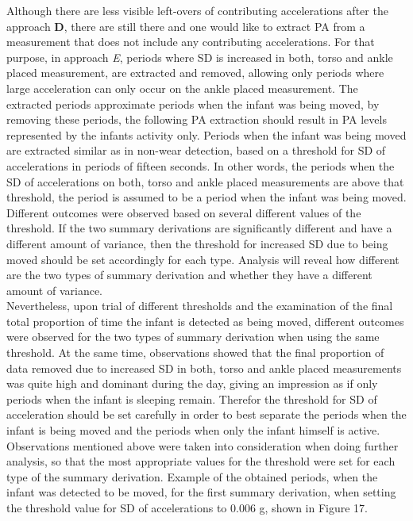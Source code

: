 \documentclass{article}
\begin{document}
{\newpage
Although there are less visible left-overs of contributing accelerations after the approach \textbf{D}, there are still there and one would like to extract PA from a measurement that does not include any contributing accelerations.
For that purpose, in approach \textit{E}, periods where SD is increased in both, torso and ankle placed measurement, are extracted and removed, allowing only periods where large acceleration can only occur on the ankle placed measurement. The extracted periods approximate periods when the infant was being moved, by removing these periods, the following PA extraction should result in PA levels represented by the infants activity only. Periods when the infant was being moved are extracted similar as in non-wear detection, based on a threshold for SD of accelerations in periods of fifteen seconds. In other words, the periods when the SD of accelerations on both, torso and ankle placed measurements are above that threshold, the period is assumed to be a period when the infant was being moved. Different outcomes were observed based on several different values of the threshold. If the two summary derivations are significantly different and have a different amount of variance, then the threshold for increased SD due to being moved should be set accordingly for each type. Analysis will reveal how different are the two types of summary derivation and whether they have a different amount of variance.\\
Nevertheless, upon trial of different thresholds and the examination of the final total proportion of time the infant is detected as being moved, different outcomes were observed for the two types of summary derivation when using the same threshold. At the same time, observations showed that the final proportion of data removed due to increased SD in both, torso and ankle placed measurements was quite high and dominant during the day, giving an impression as if only periods when the infant is sleeping remain. Therefor the threshold for SD of acceleration should be set carefully in order to best separate the periods when the infant is being moved and the periods when only the infant himself is active. Observations mentioned above were taken into consideration when doing further analysis, so that the most appropriate values for the threshold were set for each type of the summary derivation. Example of the obtained periods, when the infant was detected to be moved, for the first summary derivation, when setting the threshold value for SD of accelerations to 0.006 g, shown in Figure 17.
\begin{figure}[h]

\end{figure}}
\end{document}
